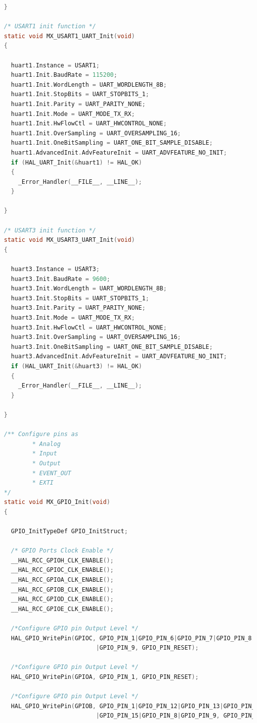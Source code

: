 \begin{lstlisting}[language = c]
}

/* USART1 init function */
static void MX_USART1_UART_Init(void)
{

  huart1.Instance = USART1;
  huart1.Init.BaudRate = 115200;
  huart1.Init.WordLength = UART_WORDLENGTH_8B;
  huart1.Init.StopBits = UART_STOPBITS_1;
  huart1.Init.Parity = UART_PARITY_NONE;
  huart1.Init.Mode = UART_MODE_TX_RX;
  huart1.Init.HwFlowCtl = UART_HWCONTROL_NONE;
  huart1.Init.OverSampling = UART_OVERSAMPLING_16;
  huart1.Init.OneBitSampling = UART_ONE_BIT_SAMPLE_DISABLE;
  huart1.AdvancedInit.AdvFeatureInit = UART_ADVFEATURE_NO_INIT;
  if (HAL_UART_Init(&huart1) != HAL_OK)
  {
    _Error_Handler(__FILE__, __LINE__);
  }

}

/* USART3 init function */
static void MX_USART3_UART_Init(void)
{

  huart3.Instance = USART3;
  huart3.Init.BaudRate = 9600;
  huart3.Init.WordLength = UART_WORDLENGTH_8B;
  huart3.Init.StopBits = UART_STOPBITS_1;
  huart3.Init.Parity = UART_PARITY_NONE;
  huart3.Init.Mode = UART_MODE_TX_RX;
  huart3.Init.HwFlowCtl = UART_HWCONTROL_NONE;
  huart3.Init.OverSampling = UART_OVERSAMPLING_16;
  huart3.Init.OneBitSampling = UART_ONE_BIT_SAMPLE_DISABLE;
  huart3.AdvancedInit.AdvFeatureInit = UART_ADVFEATURE_NO_INIT;
  if (HAL_UART_Init(&huart3) != HAL_OK)
  {
    _Error_Handler(__FILE__, __LINE__);
  }

}

/** Configure pins as 
        * Analog 
        * Input 
        * Output
        * EVENT_OUT
        * EXTI
*/
static void MX_GPIO_Init(void)
{

  GPIO_InitTypeDef GPIO_InitStruct;

  /* GPIO Ports Clock Enable */
  __HAL_RCC_GPIOH_CLK_ENABLE();
  __HAL_RCC_GPIOC_CLK_ENABLE();
  __HAL_RCC_GPIOA_CLK_ENABLE();
  __HAL_RCC_GPIOB_CLK_ENABLE();
  __HAL_RCC_GPIOD_CLK_ENABLE();
  __HAL_RCC_GPIOE_CLK_ENABLE();

  /*Configure GPIO pin Output Level */
  HAL_GPIO_WritePin(GPIOC, GPIO_PIN_1|GPIO_PIN_6|GPIO_PIN_7|GPIO_PIN_8 
                          |GPIO_PIN_9, GPIO_PIN_RESET);

  /*Configure GPIO pin Output Level */
  HAL_GPIO_WritePin(GPIOA, GPIO_PIN_1, GPIO_PIN_RESET);

  /*Configure GPIO pin Output Level */
  HAL_GPIO_WritePin(GPIOB, GPIO_PIN_1|GPIO_PIN_12|GPIO_PIN_13|GPIO_PIN_14 
                          |GPIO_PIN_15|GPIO_PIN_8|GPIO_PIN_9, GPIO_PIN_RESET);


\end{lstlisting}

